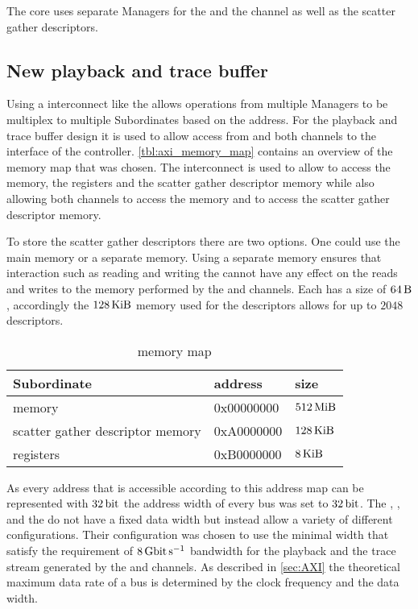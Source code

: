 The \AXIDMA{} core uses separate \AXI{} Managers for the \SToMM{} and the \MMToS{} channel as well as the scatter gather descriptors.

\subsection{New playback and trace buffer}
Using a \AXI{} interconnect like the \smartconnect{} allows operations from multiple \AXI{} Managers to be multiplex to multiple \AXI{} Subordinates based on the address.
For the playback and trace buffer design it is used to allow access from \FAXI{} and both \AXIDMA{} channels to the \AXI{} interface of the  controller.
\autoref{tbl:axi_memory_map} contains an overview of the memory map that was chosen. The interconnect is used to allow \FAXI{} to access the \DDR{} memory, the \AXIDMA{} registers and the scatter gather descriptor memory while also allowing both \AXIDMA{} channels to access the \DDR{} memory and \AXIDMA{} to access the scatter gather descriptor memory.

To store the scatter gather descriptors there are two options. One could use the main \DDR{} memory or a separate memory. Using a separate memory ensures that interaction such as reading and writing the \descriptor{} cannot have any effect on the reads and writes to the \DDR{} memory performed by the \SToMM{} and \MMToS{} channels.
Each \descriptor{} has a size of $\SI{64}{\byte}$, accordingly the $\SI{128}{\kibi\byte}$ memory used for the descriptors allows for up to $\num{2048}$ descriptors.

\begin{table}
\begin{center}
\begin{tabular}{lll}
\toprule
  \AXI{} Subordinate & address & size \\
  \midrule
  \DDR{} memory & 0x00000000 & $\SI{512}{\mebi\byte}$ \\
  scatter gather descriptor memory & 0xA0000000 & $\SI{128}{\kibi\byte}$ \\
  \AXIDMA{} registers & 0xB0000000 & $\SI{8}{\kibi\byte}$ \\
  \bottomrule
\end{tabular}
\end{center}
\caption{\AXI{} memory map}\label{tbl:axi_memory_map}
\end{table}

As every address that is accessible according to this address map can be represented with $\SI{32}{\bit}$ the address width of every \AXI{} bus was set to $\SI{32}{\bit}$.
The \AXIDMA{}, \XilinxMIG{}, \smartconnect{} and the \AXIBRAMController{} do not have a fixed \AXI{} data width but instead allow a variety of different configurations.
Their configuration was chosen to use the minimal width that satisfy the requirement of $\pbExecBandwidth{}$ bandwidth for the playback and the trace stream generated by the \MMToS{} and \SToMM{} channels.
As described in \autoref{sec:AXI} the theoretical maximum data rate of a \AXI{} bus is determined by the clock frequency and the data width.


